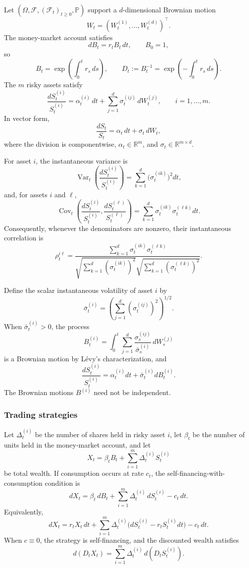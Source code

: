 Let $(\Omega,\mathcal{F},(\mathcal{F}_t)_{t\geq 0},\mathbb{P})$ support a $d$-dimensional Brownian motion
\[
W_t=(W_t^{(1)},\ldots,W_t^{(d)})^\top.
\]
The money-market account satisfies
\[
dB_t=r_tB_t\,dt,
\qquad
B_0=1,
\]
so
\[
B_t=\exp\!\left(\int_0^t r_s\,ds\right),
\qquad
D_t:=B_t^{-1}=\exp\!\left(-\int_0^t r_s\,ds\right).
\]
The $m$ risky assets satisfy
\[
\frac{dS_t^{(i)}}{S_t^{(i)}}
 =\alpha_t^{(i)}\,dt
  +\sum_{j=1}^d\sigma_t^{(ij)}\,dW_t^{(j)},
\qquad i=1,\ldots,m.
\]
In vector form,
\[
\frac{dS_t}{S_t}=\alpha_t\,dt+\sigma_t\,dW_t,
\]
where the division is componentwise, $\alpha_t\in\mathbb{R}^m$, and $\sigma_t\in\mathbb{R}^{m\times d}$.

For asset $i$, the instantaneous variance is
\[
\operatorname{Var}_t\!\left(\frac{dS_t^{(i)}}{S_t^{(i)}}\right)
 =\sum_{k=1}^d\bigl(\sigma_t^{(ik)}\bigr)^2dt,
\]
and, for assets $i$ and $\ell$,
\[
\operatorname{Cov}_t\!\left(
\frac{dS_t^{(i)}}{S_t^{(i)}},
\frac{dS_t^{(\ell)}}{S_t^{(\ell)}}
\right)
 =\sum_{k=1}^d\sigma_t^{(ik)}\sigma_t^{(\ell k)}dt.
\]
Consequently, whenever the denominators are nonzero, their instantaneous correlation is
\[
\rho_t^{i\ell}
=\frac{\sum_{k=1}^d\sigma_t^{(ik)}\sigma_t^{(\ell k)}}
{\sqrt{\sum_{k=1}^d(\sigma_t^{(ik)})^2}
 \sqrt{\sum_{k=1}^d(\sigma_t^{(\ell k)})^2}}.
\]

Define the scalar instantaneous volatility of asset $i$ by
\[
\bar\sigma_t^{(i)}
 =\left(\sum_{j=1}^d(\sigma_t^{(ij)})^2\right)^{1/2}.
\]
When $\bar\sigma_t^{(i)}>0$, the process
\[
B_t^{(i)}
 =\int_0^t\sum_{j=1}^d
   \frac{\sigma_s^{(ij)}}{\bar\sigma_s^{(i)}}\,dW_s^{(j)}
\]
is a Brownian motion by L\'evy's characterization, and
\[
\frac{dS_t^{(i)}}{S_t^{(i)}}
 =\alpha_t^{(i)}dt+\bar\sigma_t^{(i)}dB_t^{(i)}.
\]
The Brownian motions $B^{(i)}$ need not be independent.

\subsubsection*{Trading strategies}

Let $\Delta_t^{(i)}$ be the number of shares held in risky asset $i$, let $\beta_t$ be the number of units held in the money-market account, and let
\[
X_t=\beta_tB_t+\sum_{i=1}^m\Delta_t^{(i)}S_t^{(i)}
\]
be total wealth. If consumption occurs at rate $c_t$, the self-financing-with-consumption condition is
\[
dX_t=\beta_t\,dB_t+\sum_{i=1}^m\Delta_t^{(i)}\,dS_t^{(i)}-c_t\,dt.
\]
Equivalently,
\[
dX_t
=r_tX_t\,dt
+\sum_{i=1}^m\Delta_t^{(i)}
  \bigl(dS_t^{(i)}-r_tS_t^{(i)}dt\bigr)
-c_t\,dt.
\]
When $c\equiv0$, the strategy is self-financing, and the discounted wealth satisfies
\[
d(D_tX_t)
 =\sum_{i=1}^m\Delta_t^{(i)}\,d(D_tS_t^{(i)}).
\]

